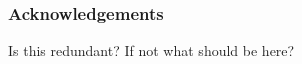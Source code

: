 \documentclass{beamer}
\begin{document}
%    
%  
%
%
%





\begin{frame}
  \frametitle{Acknowledgements}
  Is this redundant? If not what should be here?
\end{frame}
\end{document}
